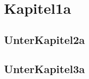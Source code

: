 \chapter{Kapitel1a}
\label{sec:Kapitel1a}

\section{UnterKapitel2a}
\label{sec:UnterKapitel3a}

\section{UnterKapitel3a}
\label{sec:UnterKapitel3a}
